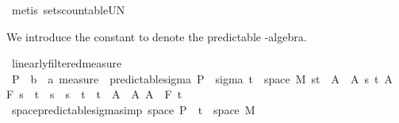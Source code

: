 \begin{isabellebody}
\ {\isacharparenleft}{\kern0pt}metis\ sets{\isachardot}{\kern0pt}countable{\isacharunderscore}{\kern0pt}UN{\isacharparenright}{\kern0pt}\isanewline
\ \ \isamarkupfalse%
\isanewline
{}\isamarkupfalse%
%
\endisatagproof
{\isafoldproof}%
%
\isadelimproof
%
\endisadelimproof
%
\isadelimdocument
%
\endisadelimdocument
%
\isatagdocument
%
\isamarkuptrue%
%
\endisatagdocument
{\isafolddocument}%
%
\isadelimdocument
%
\endisadelimdocument
%
\begin{isamarkuptext}%
We introduce the constant  to denote the predictable \isa{{\isasymsigma}}-algebra.%
\end{isamarkuptext}\isamarkuptrue%
\isamarkupfalse%
\ linearly{\isacharunderscore}{\kern0pt}filtered{\isacharunderscore}{\kern0pt}measure\isanewline
{}\isanewline
\isanewline
{}\isamarkupfalse%
\ {\isasymSigma}\isactrlsub P\ {\isacharcolon}{\kern0pt}{\isacharcolon}{\kern0pt}\ {\isachardoublequoteopen}{\isacharparenleft}{\kern0pt}{\isacharprime}{\kern0pt}b\ {\isasymtimes}\ {\isacharprime}{\kern0pt}a{\isacharparenright}{\kern0pt}\ measure{\isachardoublequoteclose}\ \ predictable{\isacharunderscore}{\kern0pt}sigma{\isacharcolon}{\kern0pt}\ {\isachardoublequoteopen}{\isasymSigma}\isactrlsub P\ {\isasymequiv}\ sigma\ {\isacharparenleft}{\kern0pt}{\isacharbraceleft}{\kern0pt}t\ {\isasymtimes}\ space\ M{\isacharparenright}{\kern0pt}\ {\isacharparenleft}{\kern0pt}{\isacharbraceleft}{\kern0pt}{\isacharbraceleft}{\kern0pt}s{\isacharless}{\kern0pt}{\isachardot}{\kern0pt}{\isachardot}{\kern0pt}t{\isacharbraceright}{\kern0pt}\ {\isasymtimes}\ A\ {\isacharbar}{\kern0pt}\ A\ s\ t{\isachardot}{\kern0pt}\ A\ {\isasymin}\ F\ s\ {\isasymand}\ t\ {\isasymle}\ s\ {\isasymand}\ s\ {\isacharless}{\kern0pt}\ t{\isacharbraceright}{\kern0pt}\ {\isasymunion}\ {\isacharbraceleft}{\kern0pt}{\isacharbraceleft}{\kern0pt}t\ {\isasymtimes}\ A\ {\isacharbar}{\kern0pt}\ A{\isachardot}{\kern0pt}\ A\ {\isasymin}\ F\ t\isanewline
\isanewline
{}\isamarkupfalse%
\ space{\isacharunderscore}{\kern0pt}predictable{\isacharunderscore}{\kern0pt}sigma{\isacharbrackleft}{\kern0pt}simp{\isacharbrackright}{\kern0pt}{\isacharcolon}{\kern0pt}\ {\isachardoublequoteopen}space\ {\isasymSigma}\isactrlsub P\ {\isacharequal}{\kern0pt}\ {\isacharparenleft}{\kern0pt}{\isacharbraceleft}{\kern0pt}t\ {\isasymtimes}\ space\ M{\isacharparenright}{\kern0pt}{\isachardoublequoteclose}%

\end{isabellebody}
